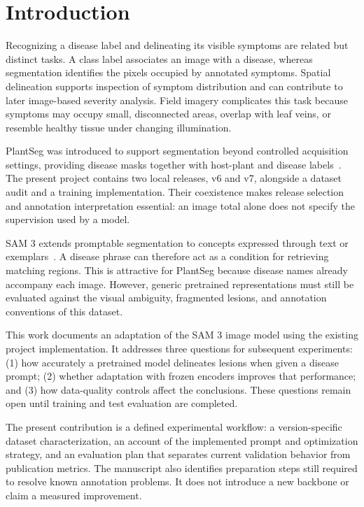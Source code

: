 \section{Introduction}
Recognizing a disease label and delineating its visible symptoms are related but distinct tasks. A class label associates an image with a disease, whereas segmentation identifies the pixels occupied by annotated symptoms. Spatial delineation supports inspection of symptom distribution and can contribute to later image-based severity analysis. Field imagery complicates this task because symptoms may occupy small, disconnected areas, overlap with leaf veins, or resemble healthy tissue under changing illumination.

PlantSeg was introduced to support segmentation beyond controlled acquisition settings, providing disease masks together with host-plant and disease labels~\cite{plantseg}. The present project contains two local releases, v6 and v7, alongside a dataset audit and a training implementation. Their coexistence makes release selection and annotation interpretation essential: an image total alone does not specify the supervision used by a model.

SAM 3 extends promptable segmentation to concepts expressed through text or exemplars~\cite{sam3}. A disease phrase can therefore act as a condition for retrieving matching regions. This is attractive for PlantSeg because disease names already accompany each image. However, generic pretrained representations must still be evaluated against the visual ambiguity, fragmented lesions, and annotation conventions of this dataset.

This work documents an adaptation of the SAM 3 image model using the existing project implementation. It addresses three questions for subsequent experiments: (1) how accurately a pretrained model delineates lesions when given a disease prompt; (2) whether adaptation with frozen encoders improves that performance; and (3) how data-quality controls affect the conclusions. These questions remain open until training and test evaluation are completed.

The present contribution is a defined experimental workflow: a version-specific dataset characterization, an account of the implemented prompt and optimization strategy, and an evaluation plan that separates current validation behavior from publication metrics. The manuscript also identifies preparation steps still required to resolve known annotation problems. It does not introduce a new backbone or claim a measured improvement.

